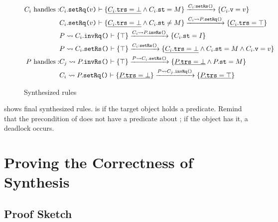 \documentclass[format=manuscript]{acmart}
\begin{document}
\begin{figure}[h]
  \begin{eqnarray*}
    C_i\ \textrm{handles}: &
    C_i.\texttt{setRq(}v\texttt{)}\vdash \{ \underline{C_i.\texttt{trs} = \bot{}} \wedge C_i.\texttt{st} = M \} \xrightarrow{C_i:\texttt{setRs()}} \{ C_i.\texttt{v} = v \} \\
    & C_i.\texttt{setRq(}v\texttt{)}\vdash \{ \underline{C_i.\texttt{trs} = \bot{}} \wedge C_i.\texttt{st} \neq M \} \xrightarrow{C_i \leadsto P.\texttt{setRq()}} \{ \underline{C_i.\texttt{trs} = \top{}} \} \\
    & P \leadsto C_i.\texttt{invRq()}\vdash \{ \top \} \xrightarrow{C_i \leadsto P.\texttt{invRs()}} \{ C_i.\texttt{st} = I \} \\
    & P \leadsto C_i.\texttt{setRs()}\vdash \{ \top \} \xrightarrow{C_i:\texttt{setRs()}} \{ \underline{C_i.\texttt{trs} = \bot{}} \wedge C_i.\texttt{st} = M \wedge C_i.\texttt{v} = v \} \\
    P\ \textrm{handles}: &
    C_j \leadsto P.\texttt{invRs()}\vdash \{ \top \} \xrightarrow{P \leadsto C_i.\texttt{setRs()}} \{ \underline{P.\texttt{trs} = \bot{}} \wedge P.\texttt{st} = M \} \\
    & C_i \leadsto P.\texttt{setRq()}\vdash \{ \underline{P.\texttt{trs} = \bot{}} \} \xrightarrow{P \leadsto C_j.\texttt{invRq()}} \{ \underline{P.\texttt{trs} = \top{}} \} \\
  \end{eqnarray*}
  \caption{Synthesized rules}
  \label{fig:synthesized-rules}
\end{figure}

 shows final synthesized rules. \trsOf{\cdot} is
\trsYes{} if the target object holds a predicate. Remind that the precondition
of  does not have a predicate about ; if the object
has it, a deadlock occurs.

\section{Proving the Correctness of Synthesis}

\subsection{Proof Sketch}
\end{document}
